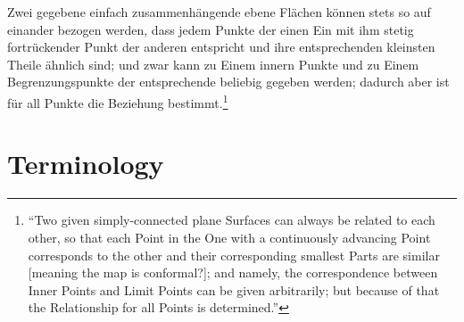 \documentclass{homework}
\author{Jim Fowler}
\begin{document}
\maketitle

\begin{inspiration}
  Zwei gegebene einfach zusammenh\"angende ebene Fl\"achen k\"onnen
    stets so auf einander bezogen werden, dass jedem Punkte der einen
      Ein mit ihm stetig fortr\"uckender Punkt der anderen entspricht und
        ihre entsprechenden kleinsten Theile \"ahnlich sind; und zwar kann
          zu Einem innern Punkte und zu Einem Begrenzungspunkte der
            entsprechende beliebig gegeben werden; dadurch aber ist f\"ur all
              Punkte die Beziehung bestimmt.\footnote{``Two given simply-connected
                  plane Surfaces can always be related to each other, so that each
                      Point in the One with a continuously advancing Point corresponds
                          to the other and their corresponding smallest Parts are similar
                              [meaning the map is conformal?]; and namely, the correspondence
                                  between Inner Points and Limit Points can be given arbitrarily;
                                      but because of that the Relationship for all Points is
                                          determined.''}  
                                                    \end{inspiration}

                                                    \section{Terminology}
\end{document}
